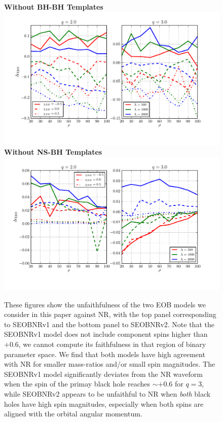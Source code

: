 \documentclass[aps,prd,amsmath,floats,floatfix, twocolumn,
superscriptaddress,nofootinbib,showpacs]{revtex4-1}
\begin{document}
% 
\begin{figure}[h]
\centering    
\textbf{Without BH-BH Templates}
\includegraphics[width=2\columnwidth]{plots/TN_BHspinBias_vs_SNR_q23.pdf}\\ 
\textbf{Without NS-BH Templates}
\includegraphics[width=2\columnwidth]{plots/TT_BHspinBias_vs_SNR_q23.pdf}%
\caption{These figures show the unfaithfulness of the two EOB models we consider
in this paper against NR, with the top panel corresponding to SEOBNRv1 and the bottom panel to
SEOBNRv2. Note that the SEOBNRv1 model does not include component spins
higher than $+0.6$, we cannot compute its faithfulness in that region of binary parameter space.
We find that both models have high agreement with NR for smaller mass-ratios 
and/or small spin magnitudes. The SEOBNRv1 model significantly deviates from the NR 
waveform when the spin of the primay black hole reaches $\sim +0.6$ for $q=3$, while
SEOBNRv2 appears to be unfaithful to NR when \textit{both} black holes have high spin 
magnitudes, especially when both spins are aligned with the orbital angular momentum.
}
\label{fig:SEOB_unfaith_TotalMass_Spin1z_Spin2z}
\end{figure}
\end{document}
